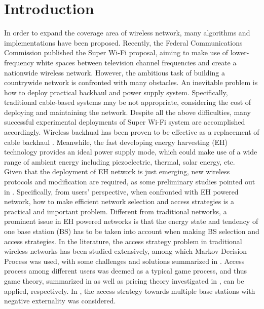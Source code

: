 \documentclass[journal,12pt,draftclsnofoot,onecolumn]{IEEEtran}
\begin{document}
\section{Introduction}
In order to expand the coverage area of wireless network,
many algorithms and implementations have been proposed.
Recently, the Federal Communications Commission published the Super Wi-Fi proposal,
aiming to make use of lower-frequency white spaces between television channel frequencies
and create a nationwide wireless network.
However, the ambitious task of building a countrywide network is confronted with many obstacles.
An inevitable problem is how to deploy practical backhaul and power supply system.
Specifically, traditional cable-based systems may be not appropriate, considering the cost of deploying and maintaining the network.
Despite all the above difficulties, many successful experimental deployments of Super Wi-Fi system are accomplished accordingly.
Wireless backhual has been proven to be effective as a replacement of cable backhaul \cite{30}.
Meanwhile, the fast developing energy harvesting (EH) technology provides an ideal power supply mode,
which could make use of a wide range of ambient energy including piezoelectric, thermal, solar energy, etc.\\
\indent Given that the deployment of EH network is just emerging,
new wireless protocols and modification are required, as some preliminary studies pointed out in \cite{27}. Specifically, from users' perspective, when confronted with EH powered network, how to make efficient network selection and access strategies is a practical and important problem. Different from traditional networks, a prominent issue in EH powered networks is that the energy state and tendency of one base station (BS) has to be taken into account when making BS selection and access strategies.
In the literature, the access strategy problem in traditional wireless networks has been studied extensively, among which
Markov Decision Process was used,
with some challenges and solutions summarized in \cite{23}.
Access process among different users was deemed as a typical game process,
and thus game theory, summarized in \cite{22}
as well as pricing theory investigated in \cite{7}, can be applied, respectively.
In \cite{5}, the access strategy towards multiple base stations with negative externality was considered.
\end{document}
